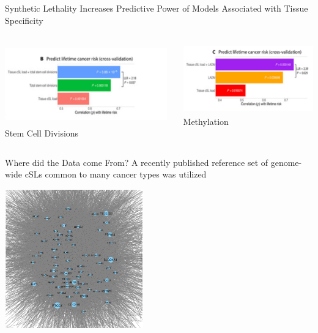 \documentclass{beamer}
\begin{document}
		\begin{frame}{Synthetic Lethality Increases Predictive Power of Models Associated with Tissue Specificity}
		\begin{columns}
			\begin{column}{0.5\textwidth}
					\includegraphics[width=7cm, height=3.5cm]{tcl2.png}
					\centering
					Stem Cell Divisions
			\end{column}
			\begin{column}{0.5\textwidth}
				\includegraphics[width=6cm, height=3cm]{tcl3.png}
				\centering
				\vspace{-0.5cm}Methylation
			\end{column}
		\end{columns}	
		\centering	
	\end{frame}

	\begin{frame}{Where did the Data come From?}
		A recently published reference set of genome-wide cSLs common to many cancer types was utilized
		\begin{center}
				\includegraphics[width=6cm,height=6cm]{corenet.png}
		\end{center}
	\end{frame}
\end{document}
